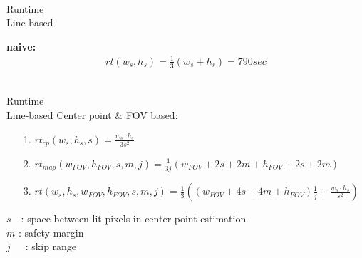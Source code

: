 \documentclass[accentcolor=tud4b,colorbacktitle,inverttitle,landscape,german,presentation,t]{tudbeamer}
\begin{document}



\begin{frame}{\\Runtime\\ \small{Line-based}}

\textbf{naive:}
\begin{align*}
rt(w_s,h_s) = \frac{1}{3}(w_s+ h_s) =790sec
\end{align*}
\end{frame}


\begin{frame}{\\Runtime\\ \small{Line-based}}
Center point \& FOV based:
\begin{itemize}\vspace{0.5cm}
\item[1.] $rt_{cp}(w_s,h_s,s) = \frac{w_s\cdot h_s}{3s^2}$\vspace{0.5cm}
\item[2.] $rt_{map}(w_{FOV},h_{FOV},s,m,j) = \frac{1}{3j}\left(w_{FOV}+2s+2m+h_{FOV}+2s+2m\right)$\vspace{0.5cm}
\item[3.] $rt\left( w_s,h_s,w_{FOV},h_{FOV},s,m,j\right) = \frac{1}{3}\left((w_{FOV}+4s+4m+h_{FOV})\frac{1}{j}+ \frac{w_s\cdot h_s}{s^2}\right)$
\end{itemize}

\vspace{0.5cm}
\small{ $s$~~: space between lit pixels in center point estimation\\ $m$ : safety margin\\ $j$~~~: skip range}

\end{frame}
\end{document}
